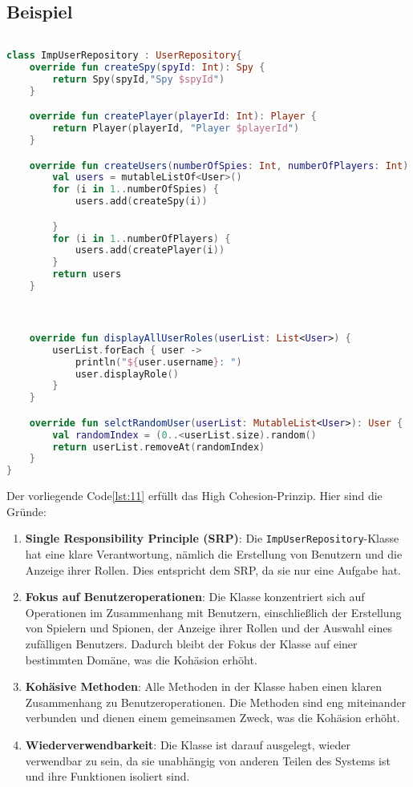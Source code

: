 \subsection*{Beispiel}
\begin{lstlisting}[language=Kotlin, caption={High Cohesion}, label={lst:11}]
    
class ImpUserRepository : UserRepository{
    override fun createSpy(spyId: Int): Spy {
        return Spy(spyId,"Spy $spyId")
    }

    override fun createPlayer(playerId: Int): Player {
        return Player(playerId, "Player $playerId")
    }

    override fun createUsers(numberOfSpies: Int, numberOfPlayers: Int): List<User> {
        val users = mutableListOf<User>()
        for (i in 1..numberOfSpies) {
            users.add(createSpy(i))

        }
        for (i in 1..numberOfPlayers) {
            users.add(createPlayer(i))
        }
        return users
    }



    override fun displayAllUserRoles(userList: List<User>) {
        userList.forEach { user ->
            println("${user.username}: ")
            user.displayRole()
        }
    }

    override fun selctRandomUser(userList: MutableList<User>): User {
        val randomIndex = (0..<userList.size).random()
        return userList.removeAt(randomIndex)
    }
}
\end{lstlisting}
Der vorliegende Code\ref{lst:11} erfüllt das High Cohesion-Prinzip. Hier sind die Gründe:

\begin{enumerate}
    \item \textbf{Single Responsibility Principle (SRP)}: Die \texttt{ImpUserRepository}-Klasse hat eine klare Verantwortung, nämlich die Erstellung von Benutzern und die Anzeige ihrer Rollen. Dies entspricht dem SRP, da sie nur eine Aufgabe hat.
    
    \item \textbf{Fokus auf Benutzeroperationen}: Die Klasse konzentriert sich auf Operationen im Zusammenhang mit Benutzern, einschließlich der Erstellung von Spielern und Spionen, der Anzeige ihrer Rollen und der Auswahl eines zufälligen Benutzers. Dadurch bleibt der Fokus der Klasse auf einer bestimmten Domäne, was die Kohäsion erhöht.
    
    \item \textbf{Kohäsive Methoden}: Alle Methoden in der Klasse haben einen klaren Zusammenhang zu Benutzeroperationen. Die Methoden sind eng miteinander verbunden und dienen einem gemeinsamen Zweck, was die Kohäsion erhöht.
    
    \item \textbf{Wiederverwendbarkeit}: Die Klasse ist darauf ausgelegt, wieder verwendbar zu sein, da sie unabhängig von anderen Teilen des Systems ist und ihre Funktionen isoliert sind.
\end{enumerate}

